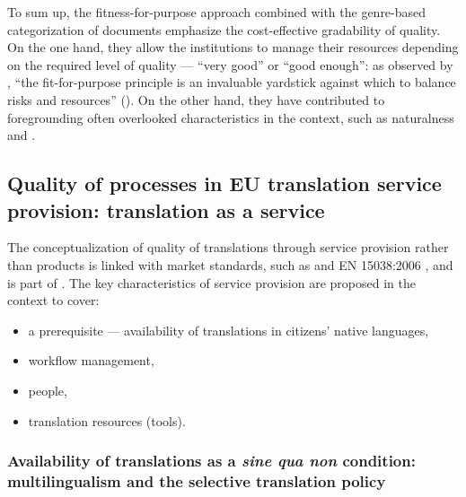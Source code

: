 \documentclass[output=paper]{langsci/langscibook}
\begin{document}
To sum up, the fitness-for-purpose approach combined with the genre-based categorization of documents emphasize the cost-effective gradability of quality. On the one hand, they allow the institutions to manage their resources depending on the required level of quality — “very good'' or “good enough'': as observed by \citeauthor{Martin2007}, “the fit-for-purpose principle is an invaluable yardstick against which to balance risks and resources” (\citeyear[60]{Martin2007}). On the other hand, they have contributed to foregrounding often overlooked characteristics in the  context, such as naturalness and .

\subsection{Quality of processes in EU translation service provision: translation as a service}\label{sec:biel:3.2}

The conceptualization of quality of translations through service provision rather than products is linked with market standards, such as \citeauthor{ISO2015} and EN 15038:2006 \nocite{EN2006}, and is part of . The key characteristics of service provision are proposed in the  context to cover:

\begin{itemize}
\item 
a prerequisite — availability of translations in  citizens’ native languages,
\item 
workflow management,
\item 
people, 
\item 
translation resources (tools).
\end{itemize}

\subsubsection{Availability of translations as a \textit{sine qua non} condition: multilingualism and the selective translation policy}\label{sec:biel:3.2.1}
\end{document}
